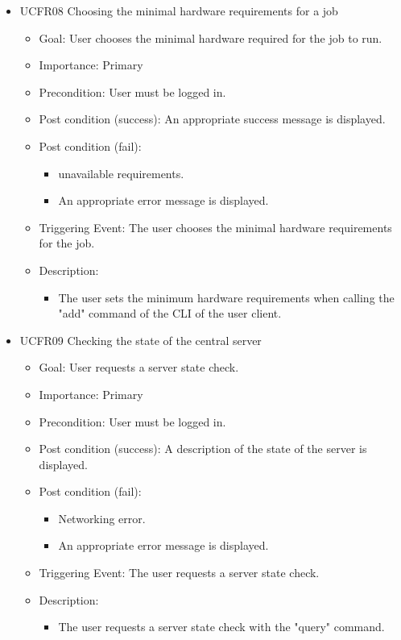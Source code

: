 \begin{itemize}
  \item  UCFR08 Choosing the minimal hardware requirements for a job
    \begin{itemize}
      \item Goal: User chooses the minimal hardware required for the job to run.
      \item Importance: Primary
      \item Precondition: User must be logged in.
      \item Post condition (success): An appropriate success message is displayed.
      \item Post condition (fail):
        \begin{itemize}
          \item unavailable requirements.
          \item An appropriate error message is displayed.
        \end{itemize}
      \item Triggering Event: The user chooses the minimal hardware requirements for the job.
      \item Description:
        \begin{itemize}
          \item The user sets the minimum hardware requirements when calling the "add" command of the CLI of the user client.
        \end{itemize}
    \end{itemize}

  \item  UCFR09 Checking the state of the central server
    \begin{itemize}
      \item Goal: User requests a server state check.
      \item Importance: Primary
      \item Precondition: User must be logged in.
      \item Post condition (success): A description of the state of the server is displayed.
      \item Post condition (fail):
        \begin{itemize}
          \item Networking error.
          \item An appropriate error message is displayed.
        \end{itemize}
      \item Triggering Event: The user requests a server state check.
      \item Description:
        \begin{itemize}
          \item The user requests a server state check with the "query" command.
        \end{itemize}
    \end{itemize}
\end{itemize}
